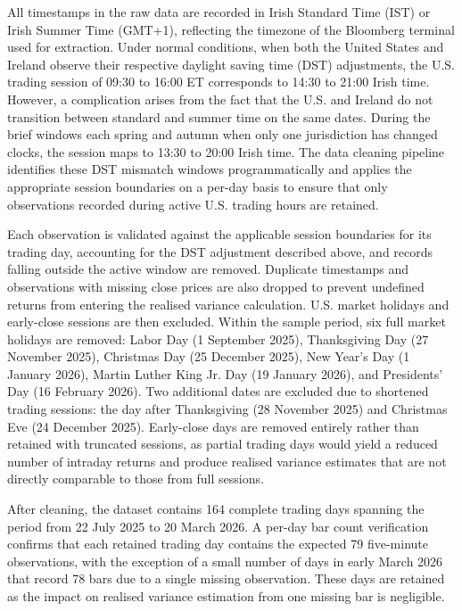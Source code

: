 All timestamps in the raw data are recorded in Irish Standard Time (IST) or Irish Summer Time (GMT+1), reflecting the timezone of the Bloomberg terminal used for extraction. Under normal conditions, when both the United States and Ireland observe their respective daylight saving time (DST) adjustments, the U.S. trading session of 09:30 to 16:00 ET corresponds to 14:30 to 21:00 Irish time. However, a complication arises from the fact that the U.S. and Ireland do not transition between standard and summer time on the same dates. During the brief windows each spring and autumn when only one jurisdiction has changed clocks, the session maps to 13:30 to 20:00 Irish time. The data cleaning pipeline identifies these DST mismatch windows programmatically and applies the appropriate session boundaries on a per-day basis to ensure that only observations recorded during active U.S. trading hours are retained.

Each observation is validated against the applicable session boundaries for its trading day, accounting for the DST adjustment described above, and records falling outside the active window are removed. Duplicate timestamps and observations with missing close prices are also dropped to prevent undefined returns from entering the realised variance calculation. U.S. market holidays and early-close sessions are then excluded. Within the sample period, six full market holidays are removed: Labor Day (1 September 2025), Thanksgiving Day (27 November 2025), Christmas Day (25 December 2025), New Year's Day (1 January 2026), Martin Luther King Jr. Day (19 January 2026), and Presidents' Day (16 February 2026). Two additional dates are excluded due to shortened trading sessions: the day after Thanksgiving (28 November 2025) and Christmas Eve (24 December 2025). Early-close days are removed entirely rather than retained with truncated sessions, as partial trading days would yield a reduced number of intraday returns and produce realised variance estimates that are not directly comparable to those from full sessions.

After cleaning, the dataset contains 164 complete trading days spanning the period from 22 July 2025 to 20 March 2026. A per-day bar count verification confirms that each retained trading day contains the expected 79 five-minute observations, with the exception of a small number of days in early March 2026 that record 78 bars due to a single missing observation. These days are retained as the impact on realised variance estimation from one missing bar is negligible.

